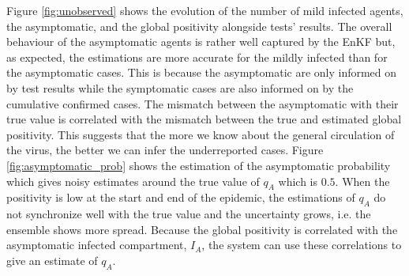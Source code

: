 \documentclass[11pt,a4paper]{article}
\begin{document}
Figure \ref{fig:unobserved} shows the evolution of the number of mild infected agents, the asymptomatic, and the global positivity alongside tests' results. The overall behaviour of the asymptomatic agents is rather well captured by the EnKF but, as expected, the estimations are more accurate for the mildly infected than for the asymptomatic cases. This is because the asymptomatic are only informed on by test results while the symptomatic cases are also informed on by the cumulative confirmed cases. The mismatch between the asymptomatic with their true value is correlated with the mismatch between the true and estimated global positivity. This suggests that the more we know about the general circulation of the virus, the better we can infer the underreported cases. Figure \ref{fig:asymptomatic_prob} shows the estimation of the asymptomatic probability which gives noisy estimates around the true value of $q_A$ which is $0.5$. When the positivity is low at the start and end of the epidemic, the estimations of $q_A$ do not synchronize well with the true value and the uncertainty grows, i.e. the ensemble shows more spread. Because the global positivity is correlated with the asymptomatic infected compartment, $I_A$, the system can use these correlations to give an estimate of $q_A$. 
\end{document}
